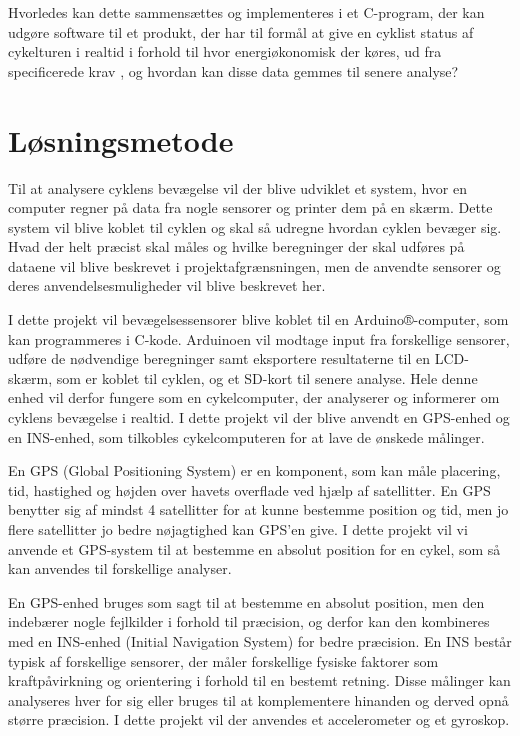 Hvorledes kan dette sammensættes og implementeres i et C-program, der kan udgøre software til et produkt, der har til formål at give en cyklist status af cykelturen i realtid i forhold til hvor energiøkonomisk der køres, ud fra specificerede krav , og hvordan kan disse data gemmes til senere analyse?

\newpage

\section{Løsningsmetode}
Til at analysere cyklens bevægelse vil der blive udviklet et system, hvor en computer regner på data fra nogle sensorer og printer dem på en skærm. Dette system vil blive koblet til cyklen og skal så udregne hvordan cyklen bevæger sig.  Hvad der helt præcist skal måles og hvilke beregninger der skal udføres på dataene vil blive beskrevet i projektafgrænsningen, men de anvendte sensorer og deres anvendelsesmuligheder  vil blive beskrevet her. 

I dette projekt vil bevægelsessensorer blive koblet til en Arduino®-computer, som kan programmeres i C-kode. Arduinoen vil modtage input fra forskellige sensorer, udføre de nødvendige beregninger samt eksportere resultaterne til en LCD-skærm, som er koblet til cyklen, og et SD-kort til senere analyse. Hele denne enhed vil derfor fungere som en cykelcomputer, der analyserer og informerer om cyklens bevægelse i realtid. I dette projekt vil der blive anvendt en GPS-enhed og en INS-enhed, som tilkobles cykelcomputeren for at lave de ønskede målinger. 

En GPS (Global Positioning System) er en komponent, som kan måle placering, tid, hastighed og højden over havets overflade ved hjælp af satellitter. En GPS benytter sig af mindst 4 satellitter for at kunne bestemme position og tid, men jo flere satellitter jo bedre nøjagtighed kan GPS’en give.  I dette projekt vil vi anvende et GPS-system til at bestemme en absolut position for en cykel, som så kan anvendes til forskellige analyser. 

En GPS-enhed bruges som sagt til at bestemme en absolut position, men den indebærer nogle fejlkilder i forhold til præcision, og derfor kan den kombineres med en INS-enhed (Initial Navigation System) for bedre præcision. En INS består typisk af forskellige sensorer, der måler forskellige fysiske faktorer som kraftpåvirkning og orientering i forhold til en bestemt retning.  Disse målinger kan analyseres hver for sig eller bruges til at komplementere hinanden og derved opnå større præcision. I dette projekt vil der anvendes et accelerometer og et gyroskop.

